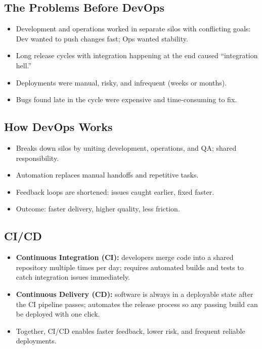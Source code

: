 \documentclass[hidelinks]{article}
\begin{document}
\subsection{The Problems Before DevOps}
\begin{itemize}
  \item Development and operations worked in separate silos with conflicting goals: Dev wanted to push
        changes fast; Ops wanted stability.
  \item Long release cycles with integration happening at the end caused ``integration hell.''
  \item Deployments were manual, risky, and infrequent (weeks or months).
  \item Bugs found late in the cycle were expensive and time-consuming to fix.
\end{itemize}

\subsection{How DevOps Works}
\begin{itemize}
  \item Breaks down silos by uniting development, operations, and QA; shared responsibility.
  \item Automation replaces manual handoffs and repetitive tasks.
  \item Feedback loops are shortened: issues caught earlier, fixed faster.
  \item Outcome: faster delivery, higher quality, less friction.
\end{itemize}

\subsection{CI/CD}
\begin{itemize}
  \item \textbf{Continuous Integration (CI):} developers merge code into a shared repository multiple
        times per day; requires automated builds and tests to catch integration issues immediately.
  \item \textbf{Continuous Delivery (CD):} software is always in a deployable state after the CI
        pipeline passes; automates the release process so any passing build can be deployed with
        one click.
  \item Together, CI/CD enables faster feedback, lower risk, and frequent reliable deployments.
\end{itemize}
\end{document}

